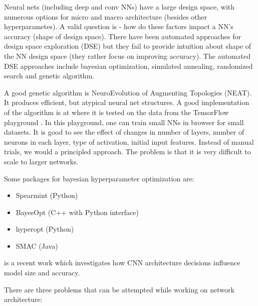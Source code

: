 \documentclass{article}
\begin{document}
Neural nets (including deep and conv NNs) have a large design space, with numerous options for micro and  macro architecture (besides other hyperparametes). A valid question is - how do these factors impact a NN's accuracy (shape of design space). There have been automated approaches for design space exploration (DSE) but they fail to provide intuition about shape of the NN design space (they rather focus on improving accuracy). The automated DSE approaches include bayesian optimization, simulated annealing, randomized search and genetic algorithm. \cite{iandola2016squeezenet}

A good genetic algorithm is NeuroEvolution of Augmenting Topologies (NEAT). It produces efficient, but atypical neural net structures. A good implementation of the algorithm is at \cite{NEATdemo} where it is tested on the data from the TensorFlow playground \cite{tensorflowplay}. In this playground, one can train small NNs in browser for small datasets. It is good to see the effect of changes in number of layers, number of neurons in each layer, type of activation, initial input features. Instead of manual trials, we would a principled approach. The problem is that it is very difficult to scale to larger networks.

Some packages for bayesian hyperparameter optimization are:

\begin{itemize}
\item Spearmint (Python) \cite{snoek2012practical}
\item BayesOpt (C++ with Python interface) \cite{martinez2014bayesopt}
\item hyperopt (Python) \cite{bergstra2013making}
\item SMAC (Java) \cite{hutter2011sequential}
\end{itemize}

\cite{iandola2016squeezenet} is a recent work which investigates how CNN architecture decisions influence model size and accuracy.

There are three problems that can be attempted while working on network architecture:
\end{document}
